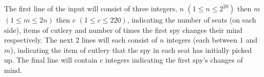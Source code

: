 The first line of the input will consist of three integers, $n$ $(1 \le n \le 2^{20})$ then $m$ $(1 \le m \le 2n)$ then $c$ $(1 \le c \le 220)$, indicating the number of seats (on each side), items of cutlery and number of times the first spy changes their mind respectively. The next $2$ lines will each consist of $n$ integers (each between $1$ and $m$), indicating the item of cutlery that the spy in each seat has initially picked up. The final line will contain $c$ integers indicating the first spy's changes of mind.
